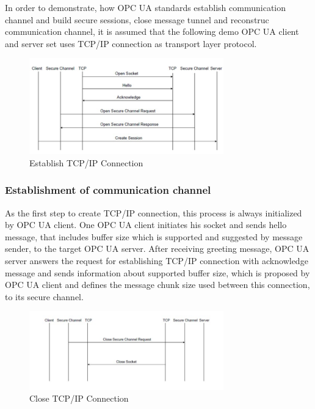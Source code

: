\documentclass[]{llncs}
\begin{document}
In order to demonstrate, how OPC UA standards establish communication channel and build secure sessions, close message tunnel and reconstruc communication channel, it is assumed that the following demo OPC UA client and server set uses TCP/IP connection as transport layer protocol.

\begin{figure}[ht]
	\centering
	\includegraphics[width=0.75\textwidth]{tcp_1.jpg}
		\caption[ ]{Establish TCP/IP Connection}
	\label{fig:tcp_1}
\end{figure}
\subsubsection{Establishment of communication channel}
As the first step to create TCP/IP connection, this process is always initialized by OPC UA client. One OPC UA client initiates his socket and sends hello message, that includes buffer size which is supported and suggested by message sender, to the target OPC UA server. After receiving greeting message, OPC UA server answers the request for establishing TCP/IP connection with acknowledge message and sends information about supported buffer size, which is proposed by OPC UA client and defines the message chunk size used between this connection, to its secure channel. 
\begin{figure}[ht]
	\centering
	\includegraphics[width=0.75\textwidth]{tcp_2.jpg}
		\caption[ ]{Close TCP/IP Connection}
	\label{fig:tcp_2}
\end{figure}
\end{document}
